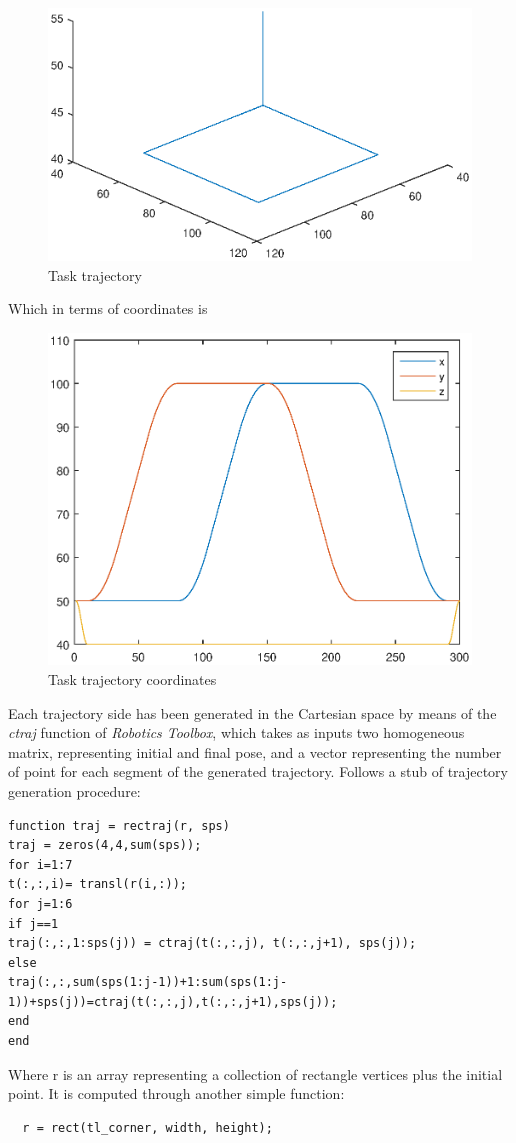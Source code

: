 \begin{figure}[!h]
\centering
\includegraphics[width=1\linewidth]{img/traj}
\caption{Task trajectory}
\label{fig:traj}
\end{figure}
Which in terms of coordinates is
\begin{figure}[!h]
	\centering
	\includegraphics[width=\linewidth]{img/trajcoord}
	\caption{Task trajectory coordinates}
	\label{fig:trajc}
\end{figure}
\newpage
Each trajectory side has been generated in the Cartesian space by means of the \textit{ctraj} function of \textit{Robotics Toolbox}, which takes as inputs two homogeneous matrix, representing initial and final pose, and a vector representing the number of point for each segment of the generated trajectory.
Follows a stub of trajectory generation procedure:
\begin{center}
\begin{lstlisting}
function traj = rectraj(r, sps)
traj = zeros(4,4,sum(sps));
for i=1:7
t(:,:,i)= transl(r(i,:));
for j=1:6
if j==1
traj(:,:,1:sps(j)) = ctraj(t(:,:,j), t(:,:,j+1), sps(j)); 
else
traj(:,:,sum(sps(1:j-1))+1:sum(sps(1:j-1))+sps(j))=ctraj(t(:,:,j),t(:,:,j+1),sps(j)); 
end        
end
\end{lstlisting}
\end{center}
Where r is an array representing a collection of rectangle vertices plus the initial point. It is computed through another simple function:
\begin{center}
\begin{lstlisting}
  r = rect(tl_corner, width, height);
\end{lstlisting}
\end{center}
